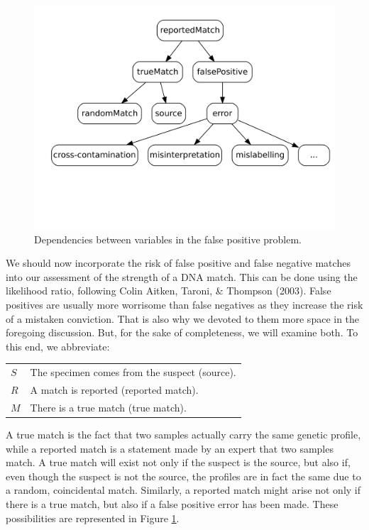 \documentclass[
  10pt,
  dvipsnames,enabledeprecatedfontcommands]{scrartcl}
\begin{document}
\begin{center}
\begin{figure}
\includegraphics[width = 12cm]{img/fpp.png}
\caption{Dependencies between variables in the false positive problem.}
\label{fig:fpp}
\end{figure}
\end{center}

We should now incorporate the risk of false positive and false negative
matches into our assessment of the strength of a DNA match. This can be
done using the likelihood ratio, following Colin Aitken, Taroni, \&
Thompson (2003). False positives are usually more worrisome than false
negatives as they increase the risk of a mistaken conviction. That is
also why we devoted to them more space in the foregoing discussion. But,
for the sake of completeness, we will examine both. To this end, we
abbreviate:

\begin{center} \hspace{10mm}
\begin{tabular}{lp{9cm}}
$S$ & The specimen comes from the suspect (source). \\
$R$ & A match is reported (reported match). \\
$M$ & There is a true match (true match).
\end{tabular}
\end{center}

\noindent A true match is the fact that two samples actually carry the
same genetic profile, while a reported match is a statement made by an
expert that two samples match. A true match will exist not only if the
suspect is the source, but also if, even though the suspect is not the
source, the profiles are in fact the same due to a random, coincidental
match. Similarly, a reported match might arise not only if there is a
true match, but also if a false positive error has been made. These
possibilities are represented in Figure \ref{fig:fpp}.
\end{document}

